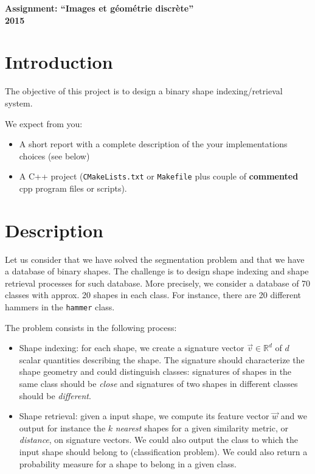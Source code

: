 \documentclass[a4paper, 11pt]{article}
\title{}
\author{}
\date{}
\begin{document}
\begin{center}
	\LARGE \textbf{Assignment: ``Images et g\'eom\'etrie discr\`ete''\\2015}
\end{center}

\section*{Introduction}

The objective of this project is to design a binary shape
indexing/retrieval system.

We expect from you:
\begin{itemize}
\item A short report with a complete description of the your
  implementations choices (see below)
\item A C++ project (\texttt{CMakeLists.txt}  or \texttt{Makefile} plus couple of
  \textbf{commented} cpp program files or scripts).
\end{itemize}


\section*{Description}

Let us consider that we have solved the segmentation problem and that
we have a database of binary shapes. The challenge is to design shape
indexing and shape retrieval processes for such database. More
precisely, we consider a database of 70 classes with approx. 20 shapes
in each class. For instance, there are 20 different hammers in the
\texttt{hammer} class.


 The problem consists in the following process:
\begin{itemize}
\item Shape indexing: for each shape, we create a signature vector
  $\vec{v}\in\mathbb{R}^d$ of $d$ scalar quantities describing the
  shape. The signature should characterize the shape geometry and
  could distinguish classes: signatures of shapes in the same class
  should be \emph{close} and signatures of two shapes in
  different classes should be \emph{different}. 
  
  \item Shape retrieval: given a input shape, we compute its feature
    vector $\vec{w}$ and we output for instance the $k$ \emph{nearest}
    shapes for a given similarity metric, or \emph{distance}, on
    signature vectors. We could also output the class to which the
    input shape should belong to (classification problem). We could
    also return a probability measure for a shape to belong in a given
    class.
\end{itemize} 
\end{document}
